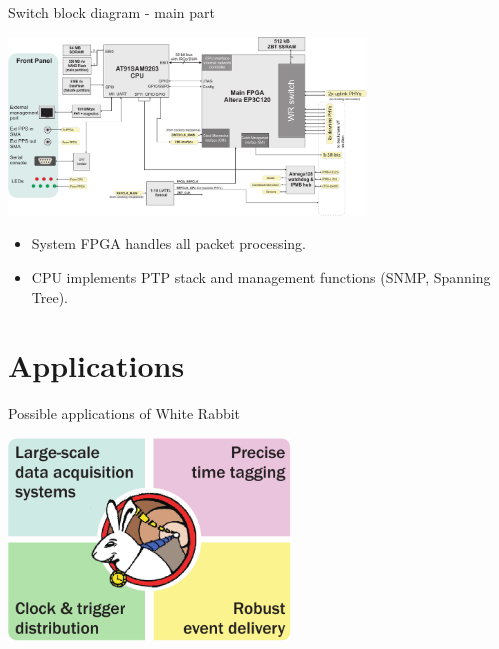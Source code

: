 \documentclass[compress,red]{beamer}
\begin{document}
\begin{frame}{Switch block diagram - main part}
\begin{center}
\includegraphics[width=9.5cm]{../../figures/switch/wrs2_fpga_diagram.pdf}
\end{center}
\begin{itemize}
\item System FPGA handles all packet processing.
\item CPU implements PTP stack and management functions (SNMP, Spanning Tree).
\end{itemize}
\end{frame}

\section{Applications}

\begin{frame}{Possible applications of White Rabbit}
\begin{center}
\includegraphics[width=7.5cm]{../../figures/applications/wr_apps.pdf}
\end{center}
\end{frame}
\end{document}
